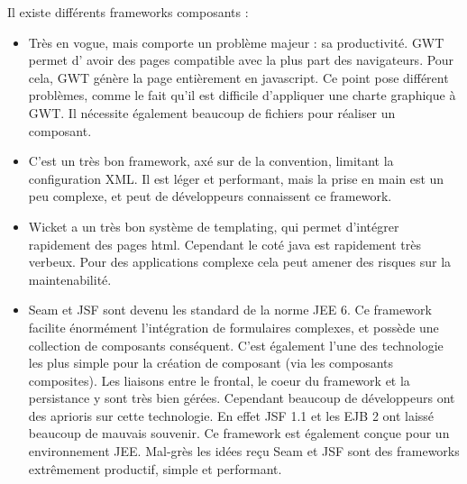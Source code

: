 Il existe différents frameworks composants :
\begin{itemize}
	\item {}
		Très en vogue, mais comporte un problème majeur : sa productivité. GWT permet d'
		avoir des pages compatible avec la plus part des navigateurs. Pour cela, GWT génère
		la page entièrement en javascript. Ce  point pose différent  problèmes, comme le fait
		qu'il est difficile d'appliquer une charte graphique à GWT. Il nécessite également beaucoup
		de fichiers pour réaliser un composant.
		\\
		
	\item {}
		C'est un très bon framework, axé sur de la convention, limitant la configuration XML.
		Il est léger et performant, mais la prise en main est un peu complexe, et peut de développeurs
		connaissent ce framework.
		\\
		
	\item {}
		Wicket a un très bon système de templating, qui permet d'intégrer rapidement des pages
		html. Cependant le coté java est rapidement très verbeux. Pour des applications complexe
		cela peut amener des risques sur la maintenabilité. 
		\\

	\item {}
		Seam et JSF sont devenu les standard de la norme JEE 6. Ce framework facilite énormément
		l'intégration de formulaires complexes, et possède une collection de composants conséquent. 
		C'est également l'une des technologie les plus simple pour la création de composant (via les
		composants composites). Les liaisons entre le frontal, le coeur du framework et la persistance
		y sont très bien gérées. Cependant beaucoup de développeurs ont des aprioris sur cette technologie.
		En effet JSF 1.1 et les EJB 2 ont laissé beaucoup de mauvais souvenir. Ce framework est également
		conçue pour un environnement JEE. Mal-grès les idées reçu Seam et JSF sont des frameworks
		extrêmement productif, simple et performant. 

\end{itemize}


